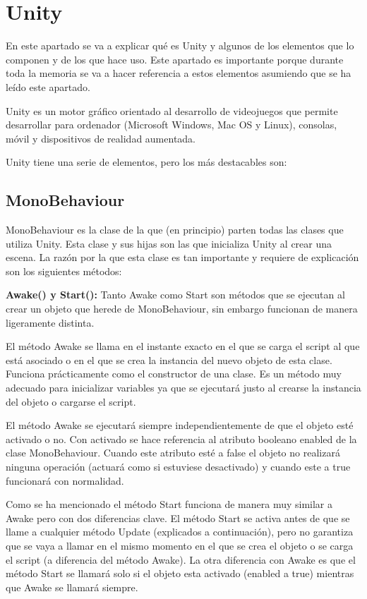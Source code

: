 
\section{Unity}
En este apartado se va a explicar qué es Unity y algunos de los elementos que lo componen y de los que hace uso. Este apartado es importante porque durante toda la memoria se va a hacer referencia a estos elementos asumiendo que se ha leído este apartado.

Unity es un motor gráfico orientado al desarrollo de videojuegos que permite desarrollar para ordenador (Microsoft Windows, Mac OS y Linux), consolas, móvil y dispositivos de realidad aumentada.

Unity tiene una serie de elementos, pero los más destacables son:

\subsection{MonoBehaviour \cite{ClaseMonobehaviour}}
MonoBehaviour es la clase de la que (en principio) parten todas las clases que utiliza Unity. Esta clase y sus hijas son las que inicializa Unity al crear una escena. La razón por la que esta clase es tan importante y requiere de explicación son los siguientes métodos:

\textbf{Awake() y Start():} Tanto Awake como Start son métodos que se ejecutan al crear un objeto que herede de MonoBehaviour, sin embargo funcionan de manera ligeramente distinta. 

El método Awake se llama en el instante exacto en el que se carga el script al que está asociado o en el que se crea la instancia del nuevo objeto de esta clase. Funciona prácticamente como el constructor de una clase. Es un método muy adecuado para inicializar variables ya que se ejecutará justo al crearse la instancia del objeto o cargarse el script. 

El método Awake se ejecutará siempre independientemente de que el objeto esté activado o no. Con activado se hace referencia al atributo booleano enabled de la clase MonoBehaviour. Cuando este atributo esté a false el objeto no realizará ninguna operación (actuará como si estuviese desactivado) y cuando este a true funcionará con normalidad.

Como se ha mencionado el método Start funciona de manera muy similar a Awake pero con dos diferencias clave. El método Start se activa antes de que se llame a cualquier método Update (explicados a continuación), pero no garantiza que se vaya a llamar en el mismo momento en el que se crea el objeto o se carga el script (a diferencia del método Awake). La otra diferencia con Awake es que el método Start se llamará solo si el objeto esta activado (enabled a true) mientras que Awake se llamará siempre.\\


